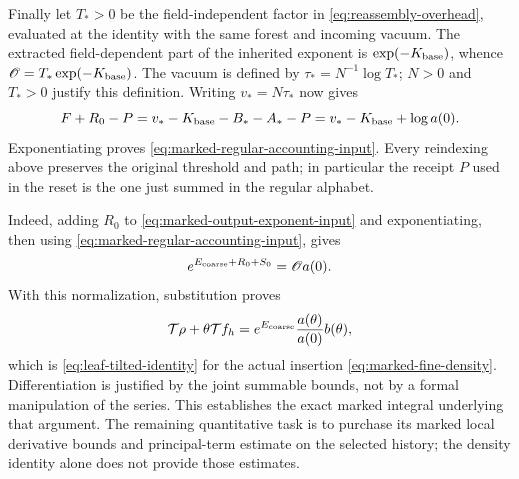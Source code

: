 Finally let $T_*>0$ be the field-independent factor in
\eqref{eq:reassembly-overhead}, evaluated at the identity with the
same forest and incoming vacuum. The extracted field-dependent part
of the inherited exponent is $\exp(-K_{\rm base})$, whence
$\mathscr O=T_*\exp(-K_{\rm base})$. The vacuum is defined by
$\tau_*=N^{-1}\log T_*$; $N>0$ and $T_*>0$ justify this definition.
Writing $v_*=N\tau_*$ now gives
\[
 F+R_0-P=v_*-K_{\rm base}-B_*-A_*-P
        =v_*-K_{\rm base}+\log a(0).
\]
Exponentiating proves \eqref{eq:marked-regular-accounting-input}.
Every reindexing above preserves the original threshold and path;
in particular the receipt $P$ used in the reset is the one just
summed in the regular alphabet.

Indeed, adding $R_0$ to \eqref{eq:marked-output-exponent-input}
and exponentiating, then using \eqref{eq:marked-regular-accounting-input},
gives
\begin{equation}\label{eq:marked-coarse-normalization}
 e^{E_{\rm coarse}+R_0+S_0}=\mathscr O a(0).
\end{equation}
With this normalization, substitution proves
\[
 \mathcal T\rho+\theta\mathcal T f_h
 =e^{E_{\rm coarse}}\frac{a(\theta)}{a(0)}b(\theta),
\]
which is \eqref{eq:leaf-tilted-identity} for the actual insertion
\eqref{eq:marked-fine-density}. Differentiation is justified by
the joint summable bounds, not by a formal manipulation of the
series. This establishes the exact marked integral underlying that
argument. The remaining quantitative task is to purchase its marked
local derivative bounds and principal-term estimate on the selected
history; the density identity alone does not provide those estimates.
